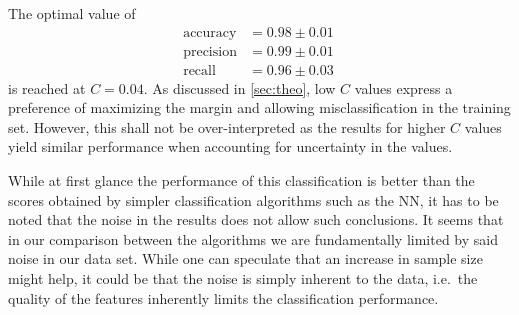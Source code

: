 \documentclass[12pt, a4paper]{scrartcl}
\begin{document}
The optimal value of
\begin{align*}
	\text{accuracy} &= 0.98 \pm 0.01 \\
	\text{precision} &= 0.99 \pm 0.01 \\
	\text{recall} &= 0.96 \pm 0.03 \
\end{align*}
is reached at $C = 0.04$. As discussed in \cref{sec:theo}, low $C$ values express a preference of maximizing the margin and allowing misclassification in the training set. However, this shall not be over-interpreted as the results for higher $C$ values yield similar performance when accounting for uncertainty in the values.

While at first glance the performance of this classification is better than the scores obtained by simpler classification algorithms such as the NN, it has to be noted that the noise in the results does not allow such conclusions. It seems that in our comparison between the algorithms we are fundamentally limited by said noise in our data set. While one can speculate that an increase in sample size might help, it could be that the noise is simply inherent to the data, i.e.\ the quality of the features inherently limits the classification performance.
\end{document}
